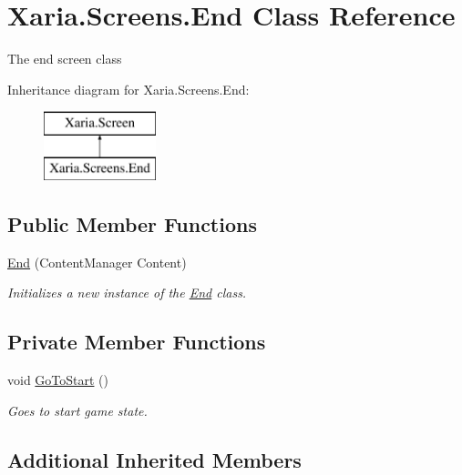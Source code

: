 \hypertarget{classXaria_1_1Screens_1_1End}{}\section{Xaria.\+Screens.\+End Class Reference}
\label{classXaria_1_1Screens_1_1End}


The end screen class  


Inheritance diagram for Xaria.\+Screens.\+End\+:\begin{figure}[H]
\begin{center}
\leavevmode
\includegraphics[height=2.000000cm]{classXaria_1_1Screens_1_1End}
\end{center}
\end{figure}
\subsection*{Public Member Functions}
\begin{DoxyCompactItemize}
\item 
\hyperlink{classXaria_1_1Screens_1_1End_a0d726b82ca97ef400e01b3cf04d9a2ed}{End} (Content\+Manager Content)
\begin{DoxyCompactList}\small\item\em Initializes a new instance of the \hyperlink{classXaria_1_1Screens_1_1End}{End} class. \end{DoxyCompactList}\end{DoxyCompactItemize}
\subsection*{Private Member Functions}
\begin{DoxyCompactItemize}
\item 
void \hyperlink{classXaria_1_1Screens_1_1End_ac0a776c1ec2fd230c497cd1eebf4a2de}{Go\+To\+Start} ()
\begin{DoxyCompactList}\small\item\em Goes to start game state. \end{DoxyCompactList}\end{DoxyCompactItemize}
\subsection*{Additional Inherited Members}


